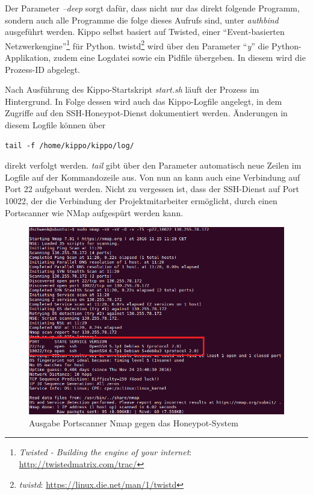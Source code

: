 Der Parameter \textit{--deep} sorgt dafür, dass nicht nur das direkt folgende Programm, sondern auch alle Programme die folge dieses Aufrufs sind, unter \textit{authbind} ausgeführt werden. Kippo selbst basiert auf Twisted, einer "`Event-basierten Netzwerkengine"'\footnote{ \textit{Twisted - Building the engine of your internet}: \url{http://twistedmatrix.com/trac/}} für Python. twistd\footnote{ \textit{twistd}: \url{https://linux.die.net/man/1/twistd}} wird über den Parameter "`\textit{y}"' die Python-Applikation, zudem eine Logdatei sowie ein Pidfile übergeben. In diesem wird die Prozess-ID abgelegt.

Nach Ausführung des Kippo-Startskript \textit{start.sh} läuft der Prozess im Hintergrund. In Folge dessen wird auch das Kippo-Logfile angelegt, in dem Zugriffe auf den SSH-Honeypot-Dienst dokumentiert werden. Änderungen in diesem Logfile können über

\begin{lstlisting}[style=customc]
tail -f /home/kippo/kippo/log/
\end{lstlisting}

direkt verfolgt werden. \textit{tail} gibt über den Parameter automatisch neue Zeilen im Logfile auf der Kommandozeile aus. Von nun an kann auch eine Verbindung auf Port 22 aufgebaut werden. Nicht zu vergessen ist, dass der SSH-Dienst auf Port 10022, der die Verbindung der Projektmitarbeiter ermöglicht, durch einen Portscanner wie NMap aufgespürt werden kann.

\begin{figure}[ht]
	\centering
		\includegraphics[width=1.0\textwidth]{img/nmap_ssh.png}
	\caption{Ausgabe Portscanner Nmap gegen das Honeypot-System}
	\label{fig:nmap_ssh}
\end{figure}

